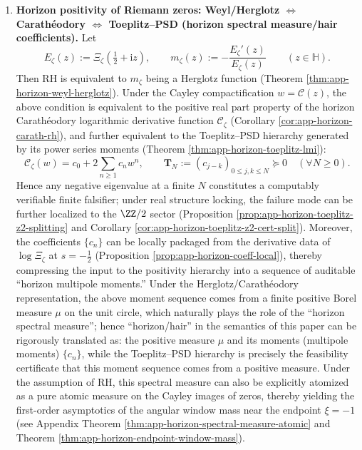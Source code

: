 \begin{enumerate}
  \item \textbf{Horizon positivity of Riemann zeros: Weyl/Herglotz \(\Leftrightarrow\) Carath\'eodory \(\Leftrightarrow\) Toeplitz--PSD (horizon spectral measure/hair coefficients).}
  Let
  \[
    E_{\zeta}(z):=\Xi_{\zeta}\!\left(\tfrac12+\mathrm{i}z\right),\qquad
    m_{\zeta}(z):=-\frac{E_{\zeta}'(z)}{E_{\zeta}(z)}\qquad(z\in\mathbb{H}).
  \]
  Then RH is equivalent to \(m_{\zeta}\) being a Herglotz function (Theorem \ref{thm:app-horizon-weyl-herglotz}).
  Under the Cayley compactification \(w=\mathcal{C}(z)\), the above condition is equivalent to the positive real part property of the horizon Carath\'eodory logarithmic derivative function \(\mathscr{C}_{\zeta}\) (Corollary \ref{cor:app-horizon-carath-rh}), and further equivalent to the Toeplitz--PSD hierarchy generated by its power series moments (Theorem \ref{thm:app-horizon-toeplitz-lmi}):
  \[
    \mathscr{C}_{\zeta}(w)=c_0+2\sum_{n\ge 1}c_n w^n,
    \qquad
    \mathbf{T}_N:=(c_{j-k})_{0\le j,k\le N}\succeq 0\quad(\forall N\ge 0).
  \]
  Hence any negative eigenvalue at a finite \(N\) constitutes a computably verifiable finite falsifier; under real structure locking, the failure mode can be further localized to the \(\ZZ/2\) sector (Proposition \ref{prop:app-horizon-toeplitz-z2-splitting} and Corollary \ref{cor:app-horizon-toeplitz-z2-cert-split}).
  Moreover, the coefficients \(\{c_n\}\) can be locally packaged from the derivative data of \(\log\Xi_{\zeta}\) at \(s=-\tfrac12\) (Proposition \ref{prop:app-horizon-coeff-local}), thereby compressing the input to the positivity hierarchy into a sequence of auditable ``horizon multipole moments.''
  Under the Herglotz/Carath\'eodory representation, the above moment sequence comes from a finite positive Borel measure \(\mu\) on the unit circle, which naturally plays the role of the ``horizon spectral measure'';
  hence ``horizon/hair'' in the semantics of this paper can be rigorously translated as: the positive measure \(\mu\) and its moments (multipole moments) \(\{c_n\}\), while the Toeplitz--PSD hierarchy is precisely the feasibility certificate that this moment sequence comes from a positive measure.
  Under the assumption of RH, this spectral measure can also be explicitly atomized as a pure atomic measure on the Cayley images of zeros, thereby yielding the first-order asymptotics of the angular window mass near the endpoint \(\xi=-1\) (see Appendix Theorem \ref{thm:app-horizon-spectral-measure-atomic} and Theorem \ref{thm:app-horizon-endpoint-window-mass}).


\end{enumerate}
